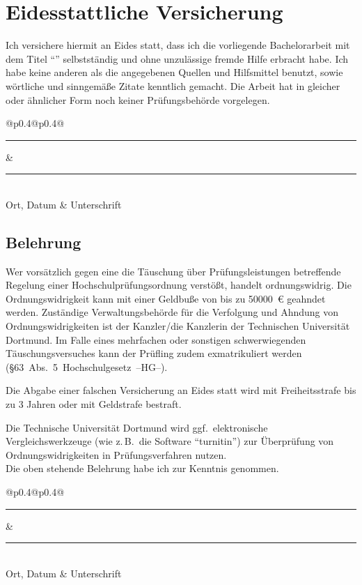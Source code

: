 \thispagestyle{empty}
\section*{Eidesstattliche Versicherung}
Ich versichere hiermit an Eides statt, dass ich die vorliegende Bachelorarbeit mit dem Titel \enquote{\thetitle} selbst\-ständig und ohne unzulässige fremde Hilfe erbracht habe.
Ich habe keine anderen als die angegebenen Quellen und Hilfsmittel benutzt, sowie wörtliche und sinngemäße Zitate kenntlich gemacht. 
Die Arbeit hat in gleicher oder ähnlicher Form noch keiner Prüfungsbehörde vorgelegen.

\vspace*{1cm}\noindent
\begin{tabular}{@{}p{0.4\textwidth}@{\hspace{0.2\textwidth}}p{0.4\textwidth}@{}}
\rule{\linewidth}{0.25pt}& \rule{\linewidth}{0.25pt}\\
Ort, Datum & Unterschrift
\end{tabular}

\subsection*{Belehrung}
Wer vorsätzlich gegen eine die Täuschung über Prüfungsleistungen betreffende Regelung einer Hochschulprüfungsordnung verstößt, handelt ordnungswidrig.
Die Ordnungswidrigkeit kann mit einer Geldbuße von bis zu \SI[round-mode=places, round-precision=2]{50000}{€} geahndet werden. 
Zuständige Verwaltungsbehörde für die Verfolgung und Ahndung von Ordnungswidrigkeiten ist der Kanzler/die Kanzlerin der Technischen Universität Dortmund. 
Im Falle eines mehrfachen oder sonstigen schwerwiegenden Täuschungsversuches kann der Prüfling zudem exmatrikuliert werden \mbox{(\S63 Abs. 5 Hochschulgesetz --HG--).}

Die Abgabe einer falschen Versicherung an Eides statt wird mit Freiheitsstrafe bis zu 3 Jahren oder mit Geldstrafe bestraft.

Die Technische Universität Dortmund wird ggf.\ elektronische Vergleichswerkzeuge (wie z.\,B.\ die Software \enquote{turnitin}) zur Überprüfung von Ordnungswidrigkeiten in Prüfungsverfahren nutzen. \\[\baselineskip]

\noindent Die oben stehende Belehrung habe ich zur Kenntnis genommen.\\[1cm]
\begin{tabular}{@{}p{0.4\textwidth}@{\hspace{0.2\textwidth}}p{0.4\textwidth}@{}}
\rule{\linewidth}{0.25pt}& \rule{\linewidth}{0.25pt}\\
Ort, Datum & Unterschrift
\end{tabular}
